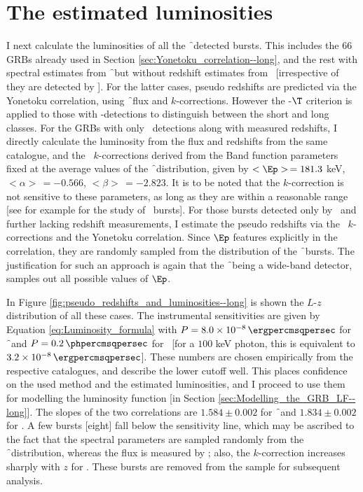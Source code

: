 \section{The estimated luminosities}
\label{sec:The_estimated_luminosities--long}

I next calculate the luminosities of all the \f\ detected bursts. This includes the $66$ GRBs already used in Section \ref{sec:Yonetoku_correlation--long}, and the rest with spectral estimates from \f\ but without redshift estimates from \s\ [irrespective of they are detected by \s]. For the latter cases, pseudo redshifts are predicted via the Yonetoku correlation, using \f\ flux and $k$-corrections. However the \s-$\T$ criterion is applied to those with \s-detections to distinguish between the short and long classes. For the GRBs with only \s\ detections along with measured redshifts, I directly calculate the luminosity from the flux and redshifts from the same catalogue, and the \s\ $k$-corrections derived from the Band function parameters fixed at the average values of the \f\ distribution, given by $<\Ep> \, =181.3$ keV, $<\alpha> \, = -0.566$, $<\beta> \, = -2.823$. It is to be noted that the $k$-correction is not sensitive to these parameters, as long as they are within a reasonable range [see for example \cite{Preece_et_al.-2000-ApJS} for the study of \B\ bursts]. For those bursts detected only by \s\ and further lacking redshift measurements, I estimate the pseudo redshifts via the \s\ $k$-corrections and the Yonetoku correlation. Since $\Ep$ features explicitly in the correlation, they are randomly sampled from the distribution of the \f\ bursts. The justification for such an approach is again that the \f\ being a wide-band detector, samples out all possible values of $\Ep$.


In Figure \ref{fig:pseudo_redshifts_and_luminosities--long} is shown the $L$-$z$ distribution of all these cases. The instrumental sensitivities are given by Equation \ref{eq:Luminosity_formula} with $P = 8.0 \times 10^{-8} \, \ergpercmsqpersec$ for \f\ and $P = 0.2 \, \phpercmsqpersec$ for \s\ [for a $100$ keV photon, this is equivalent to $3.2 \times 10^{-8} \, \ergpercmsqpersec$]. These numbers are chosen empirically from the respective catalogues, and describe the lower cutoff well. This places confidence on the used method and the estimated luminosities, and I proceed to use them for modelling the luminosity function [in Section \ref{sec:Modelling_the_GRB_LF--long}]. The slopes of the two correlations are $1.584 \pm 0.002$ for \f\ and $1.834 \pm 0.002$ for \s. A few bursts [eight] fall below the sensitivity line, which may be ascribed to the fact that the spectral parameters are sampled randomly from the \f\ distribution, whereas the flux is measured by \s; also, the $k$-correction increases sharply with $z$ for \s. These bursts are removed from the sample for subsequent analysis.



